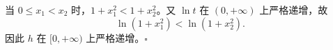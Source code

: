 当 $0\le x_1<x_2$ 时，$1+x_1^2<1+x_2^2$。又 $\ln t$ 在 $(0,+\infty)$ 上严格递增，故
\[
 \ln(1+x_1^2)<\ln(1+x_2^2).
\]
因此 $h$ 在 $[0,+\infty)$ 上严格递增。$\square$
